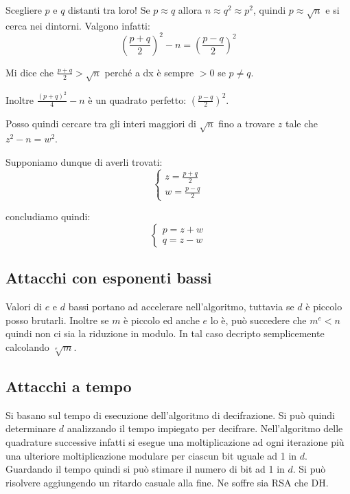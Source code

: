 Scegliere $p$ e $q$ distanti tra loro! Se $p \approx q$ allora $n \approx q^2 \approx p^2$, quindi $p \approx \sqrt{n}$ e si cerca nei dintorni. Valgono infatti:
$$ (\frac{p+q}{2})^2 -n = (\frac{p-q}{2})^2 $$

Mi dice che $\frac{p+q}{2} > \sqrt{n}$ perché a dx è sempre $> 0$ se $p \neq q$.

Inoltre $\frac{(p+q)^2}{4}-n$ è un quadrato perfetto: $(\frac{p-q}{2})^2$.

Posso quindi cercare tra gli interi maggiori di $\sqrt{n}$ fino a trovare $z$ tale che $z^2 - n = w^2$.

Supponiamo dunque di averli trovati:
\begin{equation}
    \begin{cases}
    z = \frac{p+q}{2} \\
    w = \frac{p-q}{2}
    \end{cases}
\end{equation}

concludiamo quindi:
\begin{equation}
    \begin{cases}
    p = z+w \\
    q = z-w
    \end{cases}
\end{equation}


\subsection{Attacchi con esponenti bassi}
Valori di $e$ e $d$ bassi portano ad accelerare nell'algoritmo, tuttavia se $d$ è piccolo posso brutarli.
Inoltre se $m$ è piccolo ed anche $e$ lo è, può succedere che $m^e < n$ quindi non ci sia la riduzione in modulo. In tal caso decripto semplicemente calcolando $\sqrt[e]{m}$.

\subsection{Attacchi a tempo}
Si basano sul tempo di esecuzione dell'algoritmo di decifrazione.
Si può quindi determinare $d$ analizzando il tempo impiegato per decifrare.
Nell'algoritmo delle quadrature successive infatti si esegue una moltiplicazione ad ogni iterazione più una ulteriore moltiplicazione modulare per ciascun bit uguale ad 1 in $d$.
Guardando il tempo quindi si può stimare il numero di bit ad 1 in $d$.
Si può risolvere aggiungendo un ritardo casuale alla fine.
Ne soffre sia RSA che DH.

